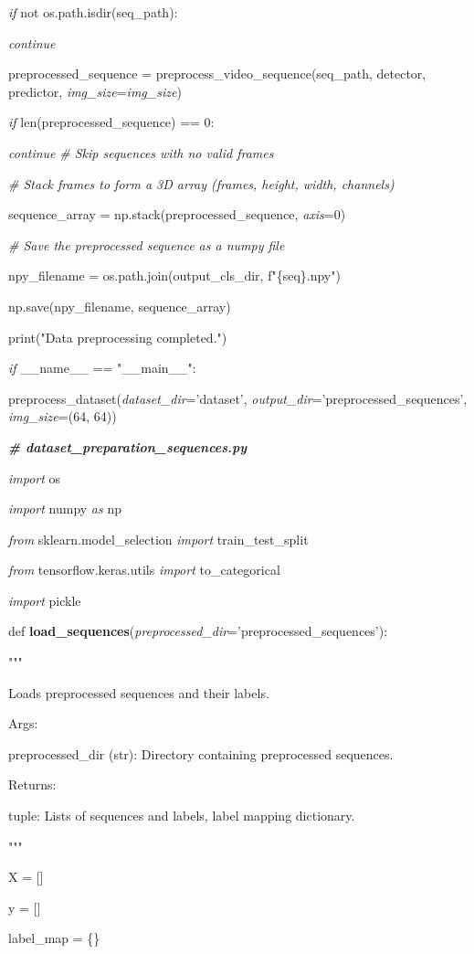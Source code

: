 \documentclass[
]{article}
\begin{document}
\emph{if} not os.path.isdir(seq\_path):

\emph{continue}

preprocessed\_sequence = preprocess\_video\_sequence(seq\_path, detector, predictor, \emph{img\_size}=\emph{img\_size})

\emph{if} len(preprocessed\_sequence) == 0:

\emph{continue} \emph{\# Skip sequences with no valid frames}

\emph{\# Stack frames to form a 3D array (frames, height, width, channels)}

sequence\_array = np.stack(preprocessed\_sequence, \emph{axis}=0)

\emph{\# Save the preprocessed sequence as a numpy file}

npy\_filename = os.path.join(output\_cls\_dir, f"\{seq\}.npy")

np.save(npy\_filename, sequence\_array)

print("Data preprocessing completed.")

\emph{if} \_\_name\_\_ == "\_\_main\_\_":

preprocess\_dataset(\emph{dataset\_dir}='dataset', \emph{output\_dir}='preprocessed\_sequences', \emph{img\_size}=(64, 64))

\emph{\textbf{\# dataset\_preparation\_sequences.py}}

\emph{import} os

\emph{import} numpy \emph{as} np

\emph{from} sklearn.model\_selection \emph{import} train\_test\_split

\emph{from} tensorflow.keras.utils \emph{import} to\_categorical

\emph{import} pickle

def \textbf{load\_sequences}(\emph{preprocessed\_dir}='preprocessed\_sequences'):

"""

Loads preprocessed sequences and their labels.

Args:

preprocessed\_dir (str): Directory containing preprocessed sequences.

Returns:

tuple: Lists of sequences and labels, label mapping dictionary.

"""

X = {[}{]}

y = {[}{]}

label\_map = \{\}
\end{document}
